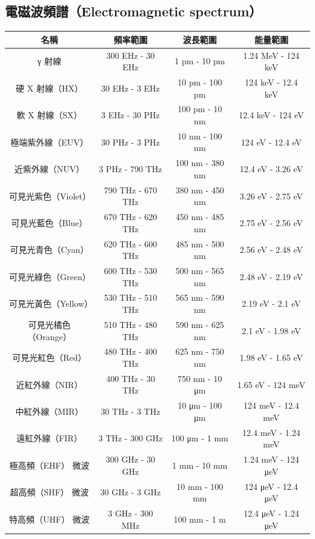 \documentclass[a4paper,12pt]{report}
\begin{document}
\begin{itemize}
\subsection{電磁波頻譜（Electromagnetic spectrum）}
\begin{longtable}[c]{|c|c|c|c|}
\hline
\textbf{名稱} & \textbf{頻率範圍} & \textbf{波長範圍} & \textbf{能量範圍} \\
\hline
γ 射線 & 300 EHz - 30 EHz & 1 pm - 10 pm & 1.24 MeV - 124 keV \\
\hline
硬 X 射線（HX） & 30 EHz - 3 EHz & 10 pm - 100 pm & 124 keV - 12.4 keV \\
\hline
軟 X 射線（SX） & 3 EHz - 30 PHz & 100 pm - 10 nm & 12.4 keV - 124 eV \\
\hline
極端紫外線（EUV） & 30 PHz - 3 PHz & 10 nm - 100 nm & 124 eV - 12.4 eV \\
\hline
近紫外線（NUV） & 3 PHz - 790 THz & 100 nm - 380 nm & 12.4 eV - 3.26 eV \\
\hline
可見光紫色（Violet） & 790 THz - 670 THz & 380 nm - 450 nm & 3.26 eV - 2.75 eV \\
\hline
可見光藍色（Blue） & 670 THz - 620 THz & 450 nm - 485 nm & 2.75 eV - 2.56 eV \\
\hline
可見光青色（Cyan） & 620 THz - 600 THz & 485 nm - 500 nm & 2.56 eV - 2.48 eV \\
\hline
可見光綠色（Green） & 600 THz - 530 THz & 500 nm - 565 nm & 2.48 eV - 2.19 eV \\
\hline
可見光黃色（Yellow） & 530 THz - 510 THz & 565 nm - 590 nm & 2.19 eV - 2.1 eV \\
\hline
可見光橘色（Orange） & 510 THz - 480 THz & 590 nm - 625 nm & 2.1 eV - 1.98 eV \\
\hline
可見光紅色（Red） & 480 THz - 400 THz & 625 nm - 750 nm & 1.98 eV - 1.65 eV \\
\hline
近紅外線（NIR） & 400 THz - 30 THz & 750 nm - 10 μm & 1.65 eV - 124 meV \\
\hline
中紅外線（MIR） & 30 THz - 3 THz & 10 μm - 100 μm & 124 meV - 12.4 meV \\
\hline
遠紅外線（FIR） & 3 THz - 300 GHz & 100 μm - 1 mm & 12.4 meV - 1.24 meV \\
\hline
極高頻（EHF） 微波 & 300 GHz - 30 GHz & 1 mm - 10 mm & 1.24 meV - 124 μeV \\
\hline
超高頻（SHF） 微波 & 30 GHz - 3 GHz & 10 mm - 100 mm & 124 μeV - 12.4 μeV \\
\hline
特高頻（UHF） 微波 & 3 GHz - 300 MHz & 100 mm - 1 m & 12.4 μeV - 1.24 μeV \\

\end{longtable}
\end{itemize}
\end{document}
